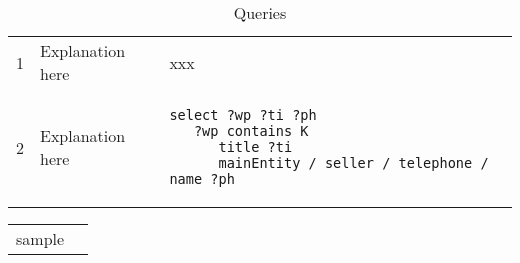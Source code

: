 

\begin{table} 
    \begin{tabular}{ l l l }
        1 & Explanation here & 
xxx\\ 
        2 & Explanation here & 
\begin{minipage}{3in}\begin{lstlisting}
select ?wp ?ti ?ph
   ?wp contains K
      title ?ti
      mainEntity / seller / telephone / name ?ph
\end{lstlisting}\end{minipage}\\  
    \end{tabular} 
    \caption{Queries} 
\end{table}

\begin{tabular}{ ll }
sample &

\end{tabular}